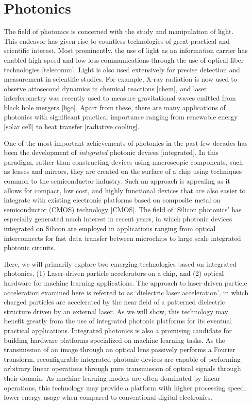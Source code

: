 \section{Photonics}


The field of photonics is concerned with the study and manipulation of light.
This endeavor has given rise to countless technologies of great practical and scientific interest.
Most prominently, the use of light as an information carrier has enabled high speed and low loss communications through the use of optical fiber technologies [telecomm].
Light is also used extensively for precise detection and measurement in  scientific studies.  
For example, X-ray radiation is now used to observe attosecond dynamics in chemical reactions [chem], and laser interferometry was recently used to measure gravitational waves emitted from black hole mergers [ligo].
Apart from these, there are many applications of photonics with significant practical importance ranging from renewable energy [solar cell] to heat transfer [radiative cooling].

One of the most important achievements of photonics in the past few decades has been the development of \textit{integrated} photonic devices [integrated].
In this paradigm, rather than constructing devices using macroscopic components, such as lenses and mirrors, they are created on the surface of a chip using techniques common to the semiconductor industry.
Such an approach is appealing as it allows for compact, low cost, and highly functional devices that are also easier to integrate with existing electronic platforms based on composite metal on semiconductor (CMOS) technology [CMOS].
The field of `Silicon photonics' has especially generated much interest in recent years, in which photonic devices integrated on Silicon are employed in applications ranging from optical interconnects for fast data transfer between microchips to large scale integrated photonic circuits.

Here, we will primarily explore two emerging technologies based on integrated photonics, (1) Laser-driven particle accelerators on a chip, and (2) optical hardware for machine learning applications.
The approach to laser-driven particle acceleration examined here is referred to as `dielectric laser acceleration', in which charged particles are accelerated by the near field of a patterned dielectric structure driven by an external laser.
As we will show, this technology may benefit greatly from the use of integrated photonic platforms for its eventual practical applications.
Integrated photonics is also a promising candidate for building hardware platforms specialized on machine learning tasks.
As the transmission of an image through an optical lens passively performs a Fourier transform, reconfigurable integrated photonic devices are capable of performing arbitrary linear operations through pure transmission of optical signals through their domain.
As machine learning models are often dominated by linear operations, this technology may provide a platform with higher processing speed, lower energy usage when compared to conventional digital electronics.

